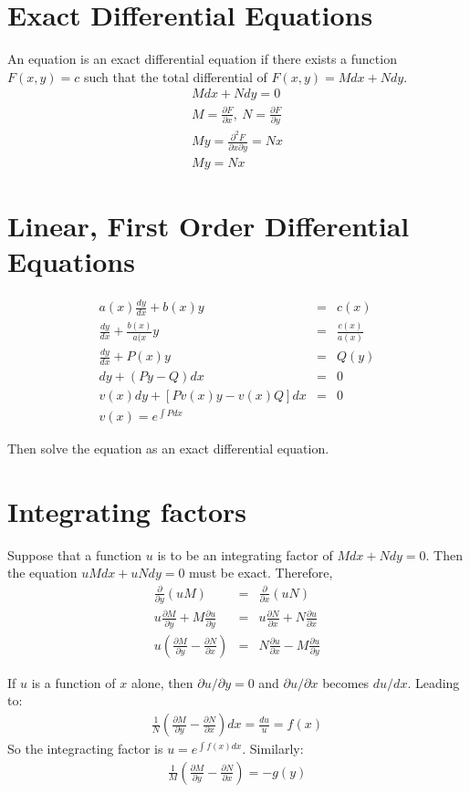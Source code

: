 \documentclass{article}
\begin{document}
\section{Exact Differential Equations}
An equation is an exact differential equation if there exists a function $F(x,y)=c$ such that the total differential of $F(x,y)=Mdx+Ndy$.
\begin{eqnarray}
Mdx + Ndy = 0 \\
M = \frac{\partial F}{\partial x}, \: N = \frac{\partial F}{\partial y} \\ 
My = \frac{\partial^2 F}{\partial x \partial y} = Nx \\
My = Nx
\end{eqnarray}

\section{Linear, First Order Differential Equations}
\begin{eqnarray}
a(x)\frac{dy}{dx} + b(x)y &=& c(x) \\
\frac{dy}{dx} + \frac{b(x)}{a(x}y &=& \frac{c(x)}{a(x)} \\
\frac{dy}{dx} + P(x)y &=& Q(y) \\
dy + (Py - Q)dx &=& 0\\
v(x)dy + [Pv(x)y - v(x)Q]dx &=& 0 \\
v(x) = e^{\int{Pdx}}
\end{eqnarray}

Then solve the equation as an exact differential equation.

\section{Integrating factors}

Suppose that a function $u$ is to be an integrating factor of $Mdx+Ndy=0$. Then the equation $uMdx+uNdy=0$ must be exact. Therefore,
\begin{eqnarray}
\frac{\partial}{\partial y}(uM) &=& \frac{\partial}{\partial x}(uN) \\
u \frac{\partial M}{\partial y} + M \frac{\partial u}{\partial y} &=& u \frac{\partial N}{\partial x} + N \frac{\partial u}{\partial x} \\
u ( \frac{\partial M}{\partial y} - \frac{\partial N}{\partial x} ) &=& N \frac{\partial u}{\partial x} - M \frac{\partial u}{\partial y}
\end{eqnarray}

If $u$ is a function of $x$ alone, then $\partial u / \partial y = 0$ and $\partial u / \partial x$ becomes $du/dx$. Leading to:
\begin{eqnarray}
\frac{1}{N}(\frac{\partial M}{\partial y} - \frac{\partial N}{\partial x})dx=\frac{du}{u} = f(x)
\end{eqnarray}
So the integracting factor is $u = e^{\int f(x) dx}$. Similarly:
\begin{eqnarray}
\frac{1}{M}(\frac{\partial M}{\partial y} - \frac{\partial N}{\partial x})=-g(y)
\end{eqnarray}
\end{document}
